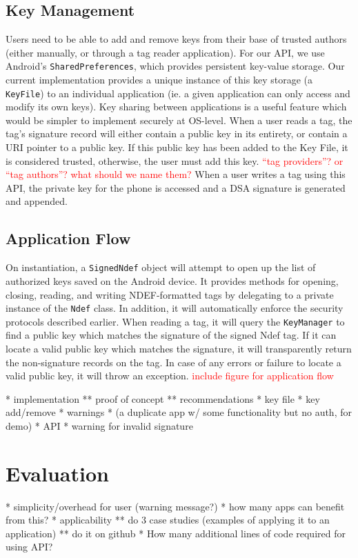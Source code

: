 \documentclass[12pt]{article}
\newcommand\TODO[1]{\textcolor{red}{#1}}
\begin{document}
\subsection{Key Management}
Users need to be able to add and remove keys from their base of trusted authors (either manually, or through a tag reader application).
For our API, we use Android's \texttt{SharedPreferences}, which provides persistent key-value storage.
Our current implementation provides a unique instance of this key storage (a \texttt{KeyFile}) to an individual application (ie. a given application can only access and modify its own keys).
Key sharing between applications is a useful feature which would be simpler to implement securely at OS-level.
When a user reads a tag, the tag's signature record will either contain a public key in its entirety, or contain a URI pointer to a public key.
If this public key has been added to the Key File, it is considered trusted, otherwise, the user must add this key.
\TODO{``tag providers''? or ``tag authors''? what should we name them?}
When a user writes a tag using this API, the private key for the phone is accessed and a DSA signature is generated and appended.

\subsection{Application Flow}
On instantiation, a \texttt{SignedNdef} object will attempt to open up the list of authorized keys saved on the Android device.
It provides methods for opening, closing, reading, and writing NDEF-formatted tags by delegating to a private instance of the \texttt{Ndef} class.
In addition, it will automatically enforce the security protocols described earlier.
When reading a tag, it will query the \texttt{KeyManager} to find a public key which matches the signature of the signed Ndef tag.
If it can locate a valid public key which matches the signature, it will transparently return the non-signature records on the tag.
In case of any errors or failure to locate a valid public key, it will throw an exception.
\TODO{include figure for application flow}


* implementation
** proof of concept
** recommendations
* key file
* key add/remove
* warnings
* (a duplicate app w/ some functionality but no auth, for demo)
* API
* warning for invalid signature

\section{Evaluation}
* simplicity/overhead for user (warning message?)
* how many apps can benefit from this?
* applicability
** do 3 case studies (examples of applying it to an application)
** do it on github
* How many additional lines of code required for using API?
\end{document}
